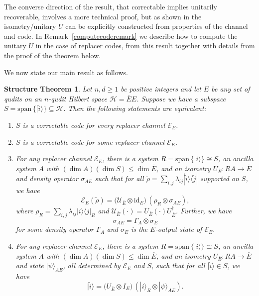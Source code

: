 \documentclass[11pt]{amsart}
\newtheorem*{structurethm}{Structure Theorem}
\theoremstyle{definition}
\theoremstyle{definition}
\theoremstyle{definition}
\newcommand{\1}{\mathbb{I}}
\def\ket#1{| #1 \rangle}
\def\kb#1#2{|#1\rangle\!\langle #2 |}
\begin{document}
The converse direction of the result, that correctable implies unitarily recoverable, involves a more technical proof, but as shown in \cite{NS06,KS06} the isometry/unitary $U$ can be explicitly constructed from properties of the channel and code. In Remark~\ref{computecoderemark} we describe how to compute the unitary $U$ in the case of replacer codes, from this result together with details from the proof of the theorem below. 



We now state our main result as follows. 

\begin{structurethm}\label{maintheorem} 
Let $n,d\geq 1$ be positive integers and let $E$ be any set of qudits on an $n$-qudit Hilbert space $\mathcal H = \overline{E} E$. Suppose we have a subspace 
$
S = \mathrm{span}\, \{ \ket{\widetilde{i}} \} \subseteq \mathcal H . 
$
Then the following statements are equivalent:  
\begin{enumerate} 
\item[$(i)$]
$S$ is a correctable code for every replacer channel $\mathcal E_E$. 

\item[$(ii)$]
$S$ is a correctable code for some replacer channel $\mathcal E_E$. 

\item[$(iii)$]
For any replacer channel $\mathcal E_E$, there is a system $R = \mathrm{span}\, \{ \ket{i} \} \cong S$, an ancilla system $A$ with $(\dim A)( \dim S) \leq \dim \overline{E}$, and an isometry $U_{\overline{E}}: RA \rightarrow \overline{E}$ and density operator $\sigma_{A E}$ such that for all $\widetilde{\rho} = \sum_{i,j} \lambda_{ij} \kb{\widetilde{i}}{\widetilde{j}}$ supported on $S$, we have  
\begin{equation}\label{unitarilycorrectableequation}  
\mathcal E_E (\widetilde{\rho}) = \big( \mathcal U_{\overline{E}} \otimes \mathrm{id}_E \big) \, ( \rho_R \otimes \sigma_{A E}  ), 
\end{equation} 
where $\rho_R = \sum_{i,j} \lambda_{ij} \kb{i}{j}_R$ and $\mathcal U_{\overline{E}} (\cdot) = U_{\overline{E}} (\cdot)  U_{\overline{E}}^\dagger$. Further, we have 
\[
\sigma_{A E} = \Gamma_{A} \otimes \sigma_E 
\]
for some density operator $\Gamma_{A}$ and $\sigma_E$ is the $E$-output state of $\mathcal E_E$.

\item[$(iv)$]
For any replacer channel $\mathcal E_E$, there is a system $R = \mathrm{span}\, \{ \ket{i} \} \cong S$, an ancilla system $A$ with $(\dim A) (\dim S) \leq \dim \overline{E}$, and an isometry $U_{\overline{E}}: RA \rightarrow \overline{E}$ and state $\ket{\psi}_{A E}$, all determined by $\mathcal E_E$ and $S$, such that for all $\ket{\widetilde{i}}\in S$, we have 
\begin{equation}\label{stateunitaryequation}
  \ket{\widetilde{i}} = \big( U_{\overline{E}} \otimes I_E \big) \, ( \ket{i}_R \otimes \ket{\psi}_{A E}).   
\end{equation}



\end{enumerate}
\end{structurethm}
\end{document}

